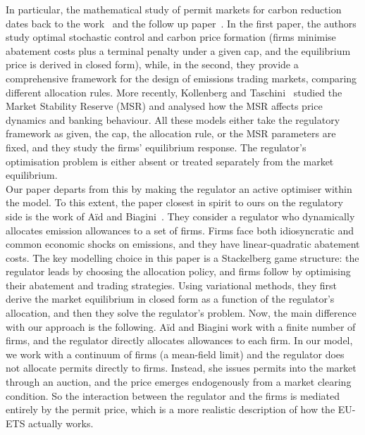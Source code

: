 \documentclass[11pt,twoside]{amsart}
\theoremstyle{definition}
\numberwithin{equation}{section}
\begin{document}
In particular, the mathematical study of permit markets for carbon reduction dates back to the work~\cite{carmona2009optimal} and the follow up paper~\cite{carmona2010market}. In the first paper, the authors study optimal stochastic control and carbon price formation (firms minimise abatement costs plus a terminal penalty under a given cap, and the equilibrium price is derived in closed form), while, in the second, they provide a comprehensive framework for the design of emissions trading markets, comparing different allocation rules.
More recently, Kollenberg and Taschini~\cite{kollenberg2019dynamic} studied the Market Stability Reserve (MSR) and analysed how the MSR affects price dynamics and banking behaviour.
All these models either take the regulatory framework as given, the cap, the allocation rule, or the MSR parameters are fixed, and they study the firms' equilibrium response. The regulator's optimisation problem is either absent or treated separately from the market equilibrium. \\
Our paper departs from this by making the regulator an active optimiser within the model. To this extent, the paper closest in spirit to ours on the regulatory side is the work of A\"id and Biagini~\cite{aid2023optimal}. They consider a regulator who dynamically allocates emission allowances to a set of firms. Firms face both idiosyncratic and common economic shocks on emissions, and they have linear-quadratic abatement costs.
The key modelling choice in this paper is a Stackelberg game structure: the regulator leads by choosing the allocation policy, and firms follow by optimising their abatement and trading strategies. Using variational methods, they first derive the market equilibrium in closed form as a function of the regulator's allocation, and then they solve the regulator's problem. 
Now, the main difference with our approach is the following. A\"id and Biagini work with a finite number of firms, and the regulator directly allocates allowances to each firm. In our model, we work with a continuum of firms (a mean-field limit) and the regulator does not allocate permits directly to firms. Instead, she issues permits into the market through an auction, and the price emerges endogenously from a market clearing condition. So the interaction between the regulator and the firms is mediated entirely by the permit price, which is a more realistic description of how the EU-ETS actually works.
\end{document}
